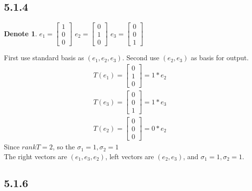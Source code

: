 \documentclass{article}
\newtheorem*{denote}{Denote}
\begin{document}
\subsection*{5.1.4}
\begin{denote}
    $e_1 = \begin{bmatrix}
        1 \\ 0 \\ 0
    \end{bmatrix}$
    $e_2 = \begin{bmatrix}
        0 \\ 1 \\ 0
    \end{bmatrix}$
    $e_3 = \begin{bmatrix}
        0 \\ 0 \\ 1
    \end{bmatrix}$
\end{denote}
First use standard basis as $(e_1, e_2, e_3)$. Second use $(e_2, e_3)$ as basis for output. \\
\begin{equation*}
    \begin{split}
        &T(e_1) = \begin{bmatrix}
            0 \\  1 \\ 0
        \end{bmatrix} = 1 * e_2\\
        &T(e_3) = \begin{bmatrix}
            0 \\  0 \\ 1
        \end{bmatrix} = 1 * e_3 \\
        &T(e_2) = \begin{bmatrix}
            0 \\  0 \\ 0
        \end{bmatrix} = 0 * e_2 
    \end{split}
\end{equation*}
Since $rank T = 2$, so the $\sigma_1 = 1, \sigma_2 = 1$ \\
The right vectors are $(e_1, e_3, e_2)$, left vectors are $(e_2, e_3)$, and $\sigma_1 = 1, \sigma_2 = 1$.

\subsection*{5.1.6}
\end{document}
